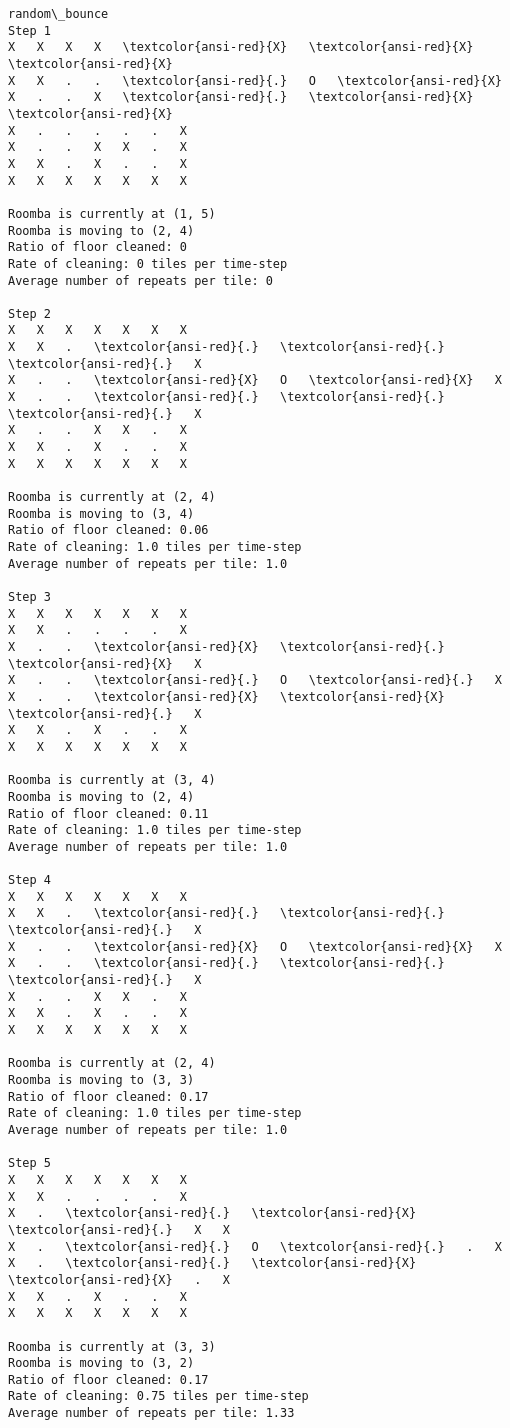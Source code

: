 \documentclass[11pt]{article}
\begin{document}
    \begin{Verbatim}[commandchars=\\\{\},fontsize=\footnotesize]
random\_bounce
Step 1
X   X   X   X   \textcolor{ansi-red}{X}   \textcolor{ansi-red}{X}   \textcolor{ansi-red}{X}
X   X   .   .   \textcolor{ansi-red}{.}   O   \textcolor{ansi-red}{X}
X   .   .   X   \textcolor{ansi-red}{.}   \textcolor{ansi-red}{X}   \textcolor{ansi-red}{X}
X   .   .   .   .   .   X
X   .   .   X   X   .   X
X   X   .   X   .   .   X
X   X   X   X   X   X   X

Roomba is currently at (1, 5)
Roomba is moving to (2, 4)
Ratio of floor cleaned: 0
Rate of cleaning: 0 tiles per time-step
Average number of repeats per tile: 0

Step 2
X   X   X   X   X   X   X
X   X   .   \textcolor{ansi-red}{.}   \textcolor{ansi-red}{.}   \textcolor{ansi-red}{.}   X
X   .   .   \textcolor{ansi-red}{X}   O   \textcolor{ansi-red}{X}   X
X   .   .   \textcolor{ansi-red}{.}   \textcolor{ansi-red}{.}   \textcolor{ansi-red}{.}   X
X   .   .   X   X   .   X
X   X   .   X   .   .   X
X   X   X   X   X   X   X

Roomba is currently at (2, 4)
Roomba is moving to (3, 4)
Ratio of floor cleaned: 0.06
Rate of cleaning: 1.0 tiles per time-step
Average number of repeats per tile: 1.0

Step 3
X   X   X   X   X   X   X
X   X   .   .   .   .   X
X   .   .   \textcolor{ansi-red}{X}   \textcolor{ansi-red}{.}   \textcolor{ansi-red}{X}   X
X   .   .   \textcolor{ansi-red}{.}   O   \textcolor{ansi-red}{.}   X
X   .   .   \textcolor{ansi-red}{X}   \textcolor{ansi-red}{X}   \textcolor{ansi-red}{.}   X
X   X   .   X   .   .   X
X   X   X   X   X   X   X

Roomba is currently at (3, 4)
Roomba is moving to (2, 4)
Ratio of floor cleaned: 0.11
Rate of cleaning: 1.0 tiles per time-step
Average number of repeats per tile: 1.0

Step 4
X   X   X   X   X   X   X
X   X   .   \textcolor{ansi-red}{.}   \textcolor{ansi-red}{.}   \textcolor{ansi-red}{.}   X
X   .   .   \textcolor{ansi-red}{X}   O   \textcolor{ansi-red}{X}   X
X   .   .   \textcolor{ansi-red}{.}   \textcolor{ansi-red}{.}   \textcolor{ansi-red}{.}   X
X   .   .   X   X   .   X
X   X   .   X   .   .   X
X   X   X   X   X   X   X

Roomba is currently at (2, 4)
Roomba is moving to (3, 3)
Ratio of floor cleaned: 0.17
Rate of cleaning: 1.0 tiles per time-step
Average number of repeats per tile: 1.0

Step 5
X   X   X   X   X   X   X
X   X   .   .   .   .   X
X   .   \textcolor{ansi-red}{.}   \textcolor{ansi-red}{X}   \textcolor{ansi-red}{.}   X   X
X   .   \textcolor{ansi-red}{.}   O   \textcolor{ansi-red}{.}   .   X
X   .   \textcolor{ansi-red}{.}   \textcolor{ansi-red}{X}   \textcolor{ansi-red}{X}   .   X
X   X   .   X   .   .   X
X   X   X   X   X   X   X

Roomba is currently at (3, 3)
Roomba is moving to (3, 2)
Ratio of floor cleaned: 0.17
Rate of cleaning: 0.75 tiles per time-step
Average number of repeats per tile: 1.33


    \end{Verbatim}
\end{document}
